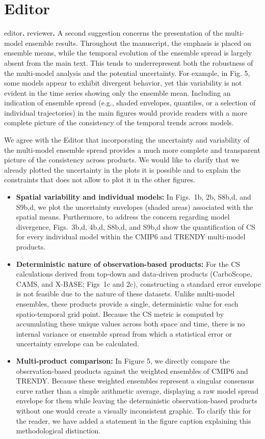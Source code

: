 \documentclass[authoryear,11pt,a4paper]{article}
\makeatletter
\newcounter{epntcnt}
\newcounter{rpntcnt}
\newenvironment{editor}[1][Editor]{%
	\setcounter{epntcnt}{0}%
	\section*{#1}%
}{}
\newcommand{\reply}[1]{%
	\begin{replybox}%
		#1
	\end{replybox}%
}
\newcommand{\point}{%
	\medskip\noindent%
	\def\@tmp{editor}%
	\ifx\@tmp\@currenvir \refstepcounter{epntcnt}\theepntcnt\textbf{.}  
	\else%
	\def\@tmp{reviewer}%
	\ifx\@tmp\@currenvir \refstepcounter{rpntcnt}\therpntcnt\textbf{.}  
	\else\fi\fi%
}
\renewcommand{\therpntcnt}{\textbf{\textup{\arabic{rpntcnt}}}}
\renewcommand{\theepntcnt}{\textbf{\textup{\arabic{epntcnt}}}}
\makeatother
\begin{document}
\begin{editor}
    \point A second suggestion concerns the presentation of the multi-model ensemble results. Throughout the manuscript, the emphasis is placed on ensemble means, while the temporal evolution of the ensemble spread is largely absent from the main text. This tends to underrepresent both the robustness of the multi-model analysis and the potential uncertainty. For example, in Fig. 5, some models appear to exhibit divergent behavior, yet this variability is not evident in the time series showing only the ensemble mean. Including an indication of ensemble spread (e.g., shaded envelopes, quantiles, or a selection of individual trajectories) in the main figures would provide readers with a more complete picture of the consistency of the temporal trends across models.
        \reply{We agree with the Editor that incorporating the uncertainty and variability of the multi-model ensemble spread provides a much more complete and transparent picture of the consistency across products. We would like to clarify that we already plotted the uncertainty in the plots it is possible and to explain the constraints that does not allow to plot it in the other figures.

        \begin{itemize}
            \item \textbf{Spatial variability and individual models:} In Figs.~1b, 2b, S8b,d, and S9b,d, we plot the uncertainty envelopes (shaded areas) associated with the spatial means. Furthermore, to address the concern regarding model divergence, Figs.~3b,d, 4b,d, S8b,d, and S9b,d show the quantification of CS for every individual model within the CMIP6 and TRENDY multi-model products.
            \item \textbf{Deterministic nature of observation-based products:} For the CS calculations derived from top-down and data-driven products (CarboScope, CAMS, and X-BASE; Figs~1c and 2c), constructing a standard error envelope is not feasible due to the nature of these datasets. Unlike multi-model ensembles, these products provide a single, deterministic value for each spatio-temporal grid point. Because the CS metric is computed by accumulating these unique values across both space and time, there is no internal variance or ensemble spread from which a statistical error or uncertainty envelope can be calculated.
            \item \textbf{Multi-product comparison:} In Figure 5, we directly compare the observation-based products against the weighted ensembles of CMIP6 and TRENDY. Because these weighted ensembles represent a singular consensus curve rather than a simple arithmetic average, displaying a raw model spread envelope for them while leaving the deterministic observation-based products without one would create a visually inconsistent graphic. To clarify this for the reader, we have added a statement in the figure caption explaining this methodological distinction.
        \end{itemize}
}
\end{editor}
\end{document}
